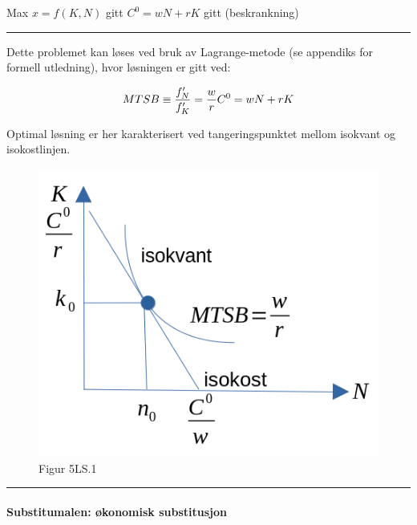 \documentclass[
  letterpaper,
  DIV=11,
  numbers=noendperiod]{scrartcl}
\let\oldparagraph\paragraph
\renewcommand{\paragraph}[1]{\oldparagraph{#1}\mbox{}}
\begin{document}
Max \(x=f(K,N)\) gitt \(C^0=wN +rK\) gitt (beskrankning)

\begin{center}\rule{0.5\linewidth}{0.5pt}\end{center}

Dette problemet kan løses ved bruk av Lagrange-metode (se appendiks for
formell utledning), hvor løsningen er gitt ved:

\begin{equation}
MTSB \equiv  \frac{f'_{N}}{f'_{K}} = \frac{w}{r} \\
C^0=wN +rK
\end{equation}

Optimal løsning er her karakterisert ved tangeringspunktet mellom
isokvant og isokostlinjen.

\begin{figure}[H]

{\centering \includegraphics[width=1\textwidth,height=\textheight]{drawio/kosmin.png}

}

\caption{Figur 5LS.1}

\end{figure}%

\begin{center}\rule{0.5\linewidth}{0.5pt}\end{center}

\paragraph{Substitumalen: økonomisk
substitusjon}\label{substitumalen-uxf8konomisk-substitusjon}
\end{document}
